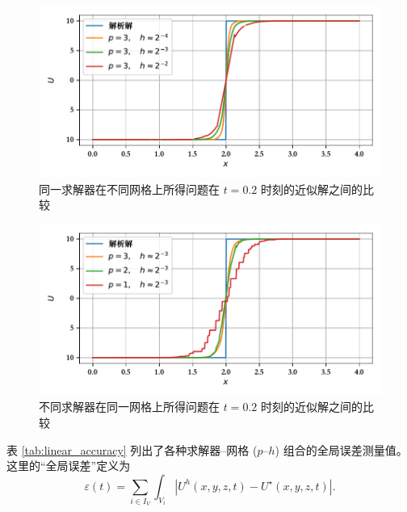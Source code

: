 \begin{figure}[h!]
\begin{centering}
\includegraphics[width=1\textwidth,height=0.3\textheight,keepaspectratio]{figures/linear_scalar/h_vary}
\par\end{centering}
\caption{\label{fig:linear_scalar_h_vary}同一求解器在不同网格上所得问题在
$t=0.2$ 时刻的近似解之间的比较}
\end{figure}

\begin{figure}[h!]
\begin{centering}
\includegraphics[width=1\textwidth,height=0.3\textheight,keepaspectratio]{figures/linear_scalar/p_vary}
\par\end{centering}
\caption{\label{fig:linear_scalar_p_vary}不同求解器在同一网格上所得问题在
$t=0.2$ 时刻的近似解之间的比较}
\end{figure}

表 \ref{tab:linear_accuracy} 列出了各种求解器–网格 ($p$–$h$) 组合的全局误差测量值。这里的“全局误差”定义为
\begin{equation}
\varepsilon(t)=\sum_{i\in I_{V}}\int_{V_{i}}\left|U^{h}(x,y,z,t)-U^{\star}(x,y,z,t)\right|.\label{eq:global-error}
\end{equation}

